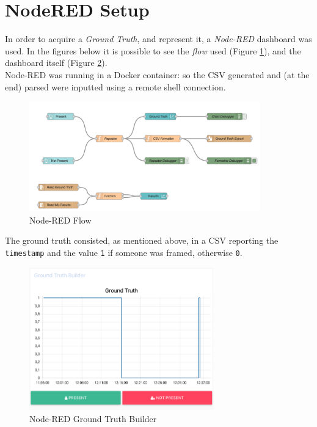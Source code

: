 \documentclass{article}
\begin{document}

\section{NodeRED Setup}

In order to acquire a \textit{Ground Truth}, and represent it, a \textit{Node-RED} dashboard was used. In the figures below it is possible to see the \textit{flow} used (Figure \ref{fig::node-red-flow}), and the dashboard itself (Figure \ref{fig::node-red-dashboard}). \\ Node-RED was running in a Docker container: so the CSV generated and (at the end) parsed were inputted using a remote shell connection.

\begin{figure}[h!]
	\centering
	\includegraphics[width=10cm]{assets/node-red-flow.png}
	\caption{Node-RED Flow}
	\label{fig::node-red-flow}
\end{figure}
The ground truth consisted, as mentioned above, in a CSV reporting the \texttt{timestamp} and the value \texttt{1} if someone was framed, otherwise \texttt{0}.

\begin{figure}[h!]
	\centering
	\includegraphics[width=8cm]{assets/ground-truth-builder.png}
	\caption{Node-RED Ground Truth Builder}
	\label{fig::node-red-dashboard}
\end{figure}
\end{document}
